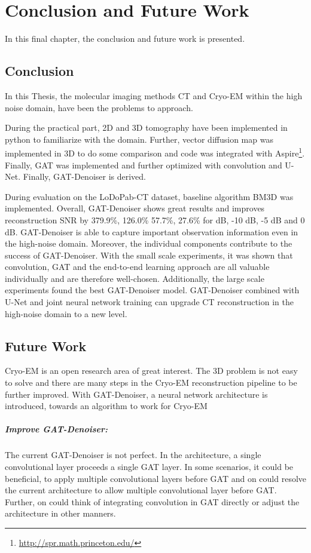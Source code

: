 \chapter{Conclusion and Future Work}
\label{sec:Conclusion}

In this final chapter, the conclusion and future work is presented.

\section{Conclusion}

In this Thesis, the molecular imaging methods CT and Cryo-EM
within the high noise domain, have been the problems to approach.

During the practical part, 2D and 3D tomography have been implemented 
in python to familiarize with the domain.
Further, vector diffusion map was implemented in 3D to do some comparison
and code was integrated with Aspire\footnote{\url{http://spr.math.princeton.edu/}}.
Finally, GAT was implemented and further optimized with convolution and U-Net.
Finally, GAT-Denoiser is derived.

During evaluation on the LoDoPab-CT dataset, baseline algorithm BM3D was implemented.
Overall, GAT-Denoiser shows great results and improves reconstruction SNR 
by 379.9\%, 126.0\% 57.7\%, 27.6\% for  dB, -10 dB, -5 dB and 0 dB.
GAT-Denoiser is able to capture important observation information even in the high-noise domain.
Moreover, the individual components contribute to the success of GAT-Denoiser.
With the small scale experiments, 
it was shown that convolution, GAT and the end-to-end learning approach are all valuable individually
and are therefore well-chosen.
Additionally, the large scale experiments found the best GAT-Denoiser model.
GAT-Denoiser combined with U-Net and joint neural network training can upgrade CT reconstruction 
in the high-noise domain to a new level. 

\section{Future Work}
Cryo-EM is an open research area of great interest.
The 3D problem is not easy to solve and there are many steps in the Cryo-EM reconstruction pipeline 
to be further improved. With GAT-Denoiser, a neural network architecture is introduced, 
towards an algorithm to work for Cryo-EM

\paragraph{Improve GAT-Denoiser:}
The current GAT-Denoiser is not perfect. 
In the architecture, a single convolutional layer proceeds a single GAT layer.
In some scenarios, it could be beneficial, to apply multiple convolutional layers before GAT and 
on could resolve the current architecture to allow multiple convolutional layer before GAT.
Further, on could think of integrating convolution in GAT directly or adjust the architecture
in other manners.


